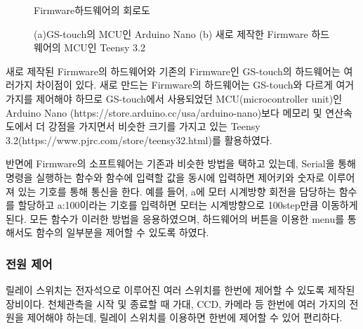 
\begin{figure}[h]
	\begin{center}
	\end{center}
	\caption{Firmware하드웨어의 회로도}
	\label{circuit01}
\end{figure}

\begin{figure}[ht]
	\begin{center}
	\end{center}
\caption{(a)GS-touch의 MCU인 Arduino Nano (b) 새로 제작한 Firmware 하드웨어의 MCU인 Teensy 3.2}
\label{mcu}
\end{figure}

새로 제작된 Firmware의 하드웨어와 기존의 Firmware인 GS-touch의 하드웨어는 여러가지 차이점이 있다. 새로 만드는 Firmware의 하드웨어는 GS-touch와 다르게 여거가지를 제어해야 하므로 GS-touch에서 사용되었던 MCU(microcontroller unit)인 Arduino Nano (https://store.arduino.cc/usa/arduino-nano)보다 메모리 및 연산속도에서 더 강점을 가지면서 비슷한 크기를 가지고 있는 Teensy 3.2(https://www.pjrc.com/store/teensy32.html)를 활용하였다. 

반면에 Firmware의 소프트웨어는 기존과 비슷한 방법을 택하고 있는데, Serial을 통해 명령을 실행하는 함수와 함수에 입력할 값을 동시에 입력하면 제어키와 숫자로 이루어져 있는 기호를 통해 통신을 한다. 예를 들어, a에 모터 시계방향 회전을 담당하는 함수를 할당하고 a:100이라는 기호를 입력하면 모터는 시계방향으로 100step만큼 이동하게 된다. 모든 함수가 이러한 방법을 응용하였으며, 하드웨어의 버튼을 이용한 menu를 통해서도 함수의 일부분을 제어할 수 있도록 하였다.

\subsubsection{전원 제어}

릴레이 스위치는 전자석으로 이루어진 여러 스위치를 한번에 제어할 수 있도록 제작된 장비이다. 천체관측을 시작 및 종료할 때 가대, CCD, 카메라 등 한번에 여러 가지의 전원을 제어해야 하는데, 릴레이 스위치를 이용하면 한번에 제어할 수 있어 편리하다. 

